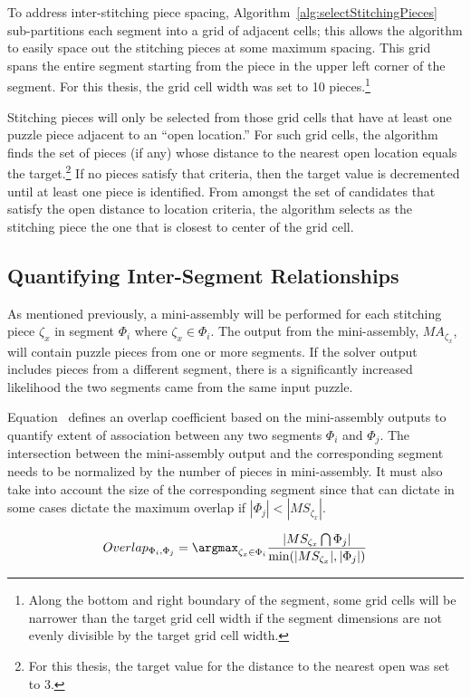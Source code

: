 To address inter-stitching piece spacing, Algorithm~\ref{alg:selectStitchingPieces} sub-partitions each segment into a grid of adjacent cells; this allows the algorithm to easily space out the stitching pieces at some maximum spacing.  This grid spans the entire segment starting from the piece in the upper left corner of the segment.  For this thesis, the grid cell width was set to 10 pieces.\footnote{Along the bottom and right boundary of the segment, some grid cells will be narrower than the target grid cell width if the segment dimensions are not evenly divisible by the target grid cell width.} 

Stitching pieces will only be selected from those grid cells that have at least one puzzle piece adjacent to an ``open location.'' For such grid cells, the algorithm finds the set of pieces (if any) whose distance to the nearest open location equals the target.\footnote{For this thesis, the target value for the distance to the nearest open was set to 3.}  If no pieces satisfy that criteria, then the target value is decremented until at least one piece is identified. From amongst the set of candidates that satisfy the open distance to location criteria, the algorithm selects as the stitching piece the one that is closest to center of the grid cell.  

\subsection{Quantifying Inter-Segment Relationships}

As mentioned previously, a mini-assembly will be performed for each stitching piece $\zeta_x$ in segment $\Phi_i$ where $\zeta_x \in \Phi_i$.  The output from the mini-assembly, $MA_{\zeta_x}$, will contain puzzle pieces from one or more segments.  If the solver output includes pieces from a different segment, there is a significantly increased likelihood the two segments came from the same input puzzle. 

Equation~ defines an overlap coefficient based on the mini-assembly outputs to quantify extent of association between any two segments $\Phi_i$ and $\Phi_j$. The intersection between the mini-assembly output and the corresponding segment needs to be normalized by the number of pieces in mini-assembly.  It must also take into account the size of the corresponding segment since that can dictate in some cases dictate the maximum overlap if $|\Phi_j| < |MS_{\zeta_x}|$.

\begin{equation} \label{eq:segmentOverlap}
Overlap_{\Phi_i,\Phi_j} = \argmax_{\zeta_x \in \Phi_i} {\frac{|MS_{\zeta_x} \bigcap \Phi_j|}{\text{min}(|MS_{\zeta_x}|, |\Phi_j|)}}
\end{equation}

